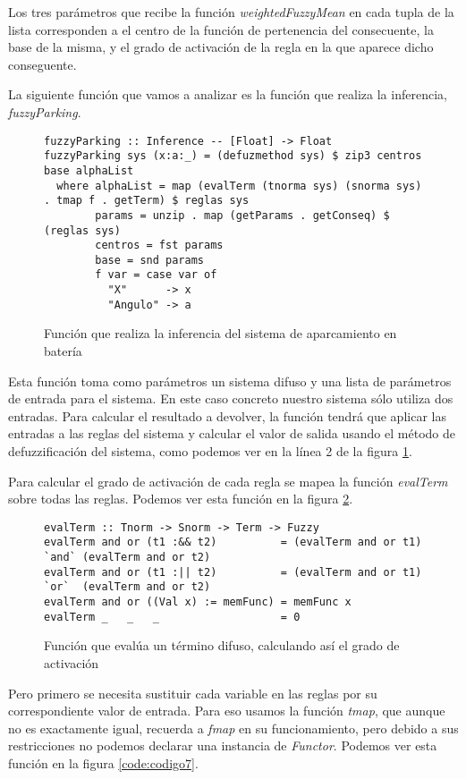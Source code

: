 Los tres parámetros que recibe la función \emph{weightedFuzzyMean} en
cada tupla de la lista corresponden a el centro de la función de
pertenencia del consecuente, la base de la misma, y el grado de
activación de la regla en la que aparece dicho conseguente.

La siguiente función que vamos a analizar es la función que realiza la
inferencia, \emph{fuzzyParking}.

\begin{figure}
\begin{lstlisting}
fuzzyParking :: Inference -- [Float] -> Float
fuzzyParking sys (x:a:_) = (defuzmethod sys) $ zip3 centros base alphaList
  where alphaList = map (evalTerm (tnorma sys) (snorma sys) . tmap f . getTerm) $ reglas sys
        params = unzip . map (getParams . getConseq) $ (reglas sys)
        centros = fst params
        base = snd params
        f var = case var of
          "X"      -> x
          "Angulo" -> a
\end{lstlisting}
\caption{Función que realiza la inferencia del sistema de aparcamiento
  en batería}
\label{code:codigo5}
\end{figure}

Esta función toma como parámetros un sistema difuso y una lista de
parámetros de entrada para el sistema. En este caso concreto nuestro
sistema sólo utiliza dos entradas. Para calcular el resultado a
devolver, la función tendrá que aplicar las entradas a las reglas del
sistema y calcular el valor de salida usando el método de
defuzzificación del sistema, como podemos ver en la línea 2 de la
figura \ref{code:codigo5}.

Para calcular el grado de activación de cada regla se mapea la función
\emph{evalTerm} sobre todas las reglas. Podemos ver esta función en la
figura \ref{code:codigo6}.

\begin{figure}
\begin{lstlisting}
evalTerm :: Tnorm -> Snorm -> Term -> Fuzzy
evalTerm and or (t1 :&& t2)          = (evalTerm and or t1) `and` (evalTerm and or t2)
evalTerm and or (t1 :|| t2)          = (evalTerm and or t1) `or`  (evalTerm and or t2)
evalTerm and or ((Val x) := memFunc) = memFunc x
evalTerm _   _   _                   = 0
\end{lstlisting}
\caption{Función que evalúa un término difuso, calculando así el grado de activación}
\label{code:codigo6}
\end{figure}

Pero primero se necesita sustituir cada variable en las reglas por su
correspondiente valor de entrada. Para eso usamos la función
\emph{tmap}, que aunque no es exactamente igual, recuerda a
\emph{fmap} en su funcionamiento, pero debido a sus restricciones no
podemos declarar una instancia de \emph{Functor}. Podemos ver esta
función en la figura \ref{code:codigo7}.

